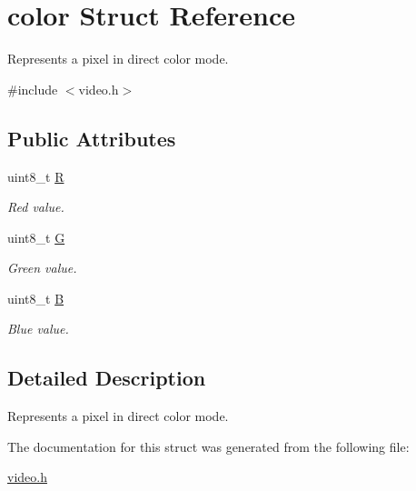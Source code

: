 \hypertarget{structcolor}{}\section{color Struct Reference}
\label{structcolor}


Represents a pixel in direct color mode.  




{\ttfamily \#include $<$video.\+h$>$}

\subsection*{Public Attributes}
\begin{DoxyCompactItemize}
\item 
uint8\+\_\+t \mbox{\hyperlink{group__video_gacb56ae92e569346b946b93e1723bdcf0}{R}}
\begin{DoxyCompactList}\small\item\em Red value. \end{DoxyCompactList}\item 
uint8\+\_\+t \mbox{\hyperlink{group__video_ga4eca011840c222b0813c622714e7a2b5}{G}}
\begin{DoxyCompactList}\small\item\em Green value. \end{DoxyCompactList}\item 
uint8\+\_\+t \mbox{\hyperlink{group__video_gaf8420cf3aa35448f046467969f1f9775}{B}}
\begin{DoxyCompactList}\small\item\em Blue value. \end{DoxyCompactList}\end{DoxyCompactItemize}


\subsection{Detailed Description}
Represents a pixel in direct color mode. 

The documentation for this struct was generated from the following file\+:\begin{DoxyCompactItemize}
\item 
\mbox{\hyperlink{video_8h}{video.\+h}}\end{DoxyCompactItemize}
